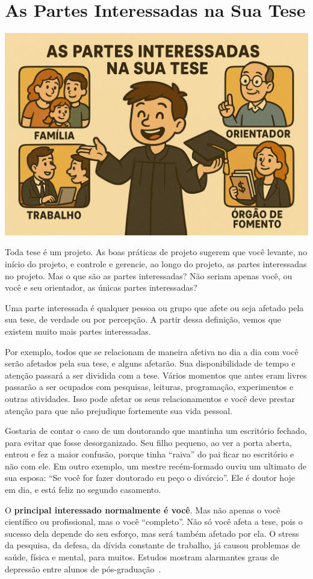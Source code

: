 \chapter{As Partes Interessadas na Sua Tese}

\begin{center}
\includegraphics[width=0.5\linewidth]{Images/partesinteressadas.png}    
\end{center}
\vspace{0.5cm}

Toda tese é um projeto. As boas práticas de projeto sugerem que você levante, no início do projeto, e controle e gerencie, ao longo do projeto, as partes interessadas no projeto.
Mas o que são as partes interessadas? Não seriam apenas você, ou você e seu orientador, as únicas partes interessadas?

Uma parte interessada é qualquer pessoa ou grupo que afete ou seja afetado pela sua tese, de verdade ou por percepção. A partir dessa definição, vemos que existem muito mais partes interessadas.

Por exemplo, todos que se relacionam de maneira afetiva no dia a dia com você serão afetados pela sua tese, e alguns afetarão. 
Sua disponibilidade de tempo e atenção passará a ser dividida com a tese. 
Vários momentos que antes eram livres passarão a ser ocupados com pesquisas, leituras, programação, experimentos e outras atividades. 
Isso pode afetar os seus relacionamentos e você deve prestar atenção para que não prejudique fortemente sua vida pessoal.

Gostaria de contar o caso de um doutorando que mantinha um escritório fechado, para evitar que fosse desorganizado. 
Seu filho pequeno, ao ver a porta aberta, entrou e fez a maior confusão, porque tinha ``raiva'' do pai ficar no escritório e não com ele. Em outro exemplo, um mestre recém-formado ouviu um ultimato de sua esposa: ``Se você for fazer doutorado eu peço o divórcio''. Ele é doutor hoje em dia, e está feliz no segundo casamento.

O \textbf{principal interessado normalmente é você}. Mas não apenas o você científico ou profissional, mas o você ``completo''. Não só você afeta a tese, pois o sucesso dela depende do seu esforço, mas será também afetado por ela. O stress da pesquisa, da defesa, da dívida constante de trabalho, já causou problemas de saúde, física e mental, para muitos. Estudos mostram alarmantes  graus de depressão entre alunos de pós-graduação~\citep{walker2015}.

